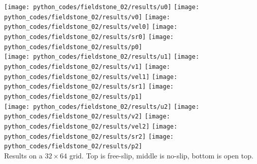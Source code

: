 \newpage
\begin{center}
\texttt{[image: python\_codes/fieldstone\_02/results/u0]}
\texttt{[image: python\_codes/fieldstone\_02/results/v0]}
\texttt{[image: python\_codes/fieldstone\_02/results/vel0]}
\texttt{[image: python\_codes/fieldstone\_02/results/sr0]}
\texttt{[image: python\_codes/fieldstone\_02/results/p0]}\\
\texttt{[image: python\_codes/fieldstone\_02/results/u1]}
\texttt{[image: python\_codes/fieldstone\_02/results/v1]}
\texttt{[image: python\_codes/fieldstone\_02/results/vel1]}
\texttt{[image: python\_codes/fieldstone\_02/results/sr1]}
\texttt{[image: python\_codes/fieldstone\_02/results/p1]}\\
\texttt{[image: python\_codes/fieldstone\_02/results/u2]}
\texttt{[image: python\_codes/fieldstone\_02/results/v2]}
\texttt{[image: python\_codes/fieldstone\_02/results/vel2]}
\texttt{[image: python\_codes/fieldstone\_02/results/sr2]}
\texttt{[image: python\_codes/fieldstone\_02/results/p2]}\\
{\captionfont Results on a $32\times 64$ grid. Top is free-slip, 
middle is no-slip, bottom is open top.}
\end{center}


